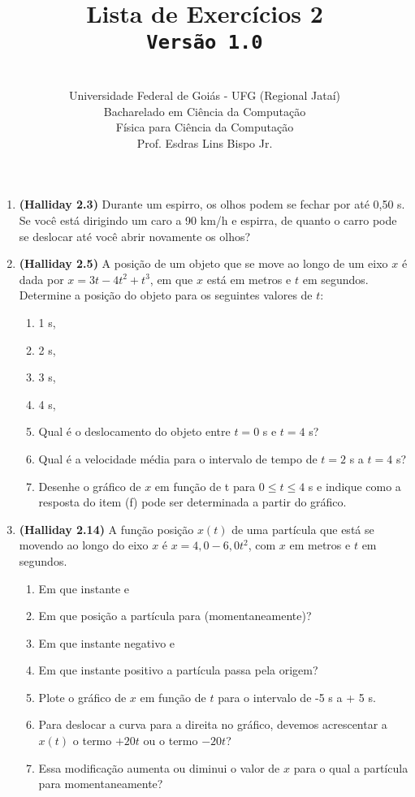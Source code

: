 \documentclass[12pt,a4paper,oneside]{article}
\author{\\Universidade Federal de Goiás - UFG (Regional Jataí) \\Bacharelado em Ciência da Computação \\Física para Ciência da Computação \\Prof. Esdras Lins Bispo Jr.}
\title{
	{\sc \huge Lista de Exercícios 2} 
	\\{\tt Versão 1.0}
}
\begin{document}
\maketitle

\begin{enumerate}

\section{Conceitos}
	
	\item {\bf (Halliday 2.3)} Durante um espirro, os olhos podem se fechar por até 0,50 s. Se você está dirigindo um caro a 90 km/h e espirra, de quanto o carro pode se deslocar até você abrir novamente os olhos?
	
	\item {\bf (Halliday 2.5)} A posição de um objeto que se move ao longo de um eixo $x$ é dada por $x = 3t - 4t^2 + t^3$, em que $x$ está em metros e $t$ em segundos. Determine a posição do objeto para os seguintes valores de $t$: 
		\begin{enumerate}
			\item 1 s,
			\item 2 s,
			\item 3 s,
			\item 4 s,
			\item Qual é o deslocamento do objeto entre $t = 0$ s e $t = 4$ s?
			\item Qual é a velocidade média para o intervalo de tempo de $t = 2$ s a $t = 4$ s?
			\item Desenhe o gráfico de $x$ em função de t para $0 \leq t \leq 4$ s e indique como a resposta do item (f) pode ser
			determinada a partir do gráfico.
		\end{enumerate}
	
	\item {\bf (Halliday 2.14)} A função posição $x(t)$ de uma partícula que está se movendo ao longo do eixo $x$ é $x = 4,0 - 6,0t^2$, com $x$ em metros e $t$ em segundos.
	\begin{enumerate}
		\item Em que instante e
		\item Em que posição a partícula para (momentaneamente)?
		\item Em que instante negativo e
		\item Em que instante positivo a partícula passa pela origem?
		\item Plote o gráfico de $x$ em função de $t$ para o intervalo de -5 s a + 5 s.
		\item Para deslocar a curva para a direita no gráfico, devemos acrescentar a $x(t)$ o termo $+20t$ ou o termo $-20t$?
		\item Essa modificação aumenta ou diminui o valor de $x$ para o qual a partícula para momentaneamente?
	\end{enumerate}
		
\end{enumerate}
\end{document}
